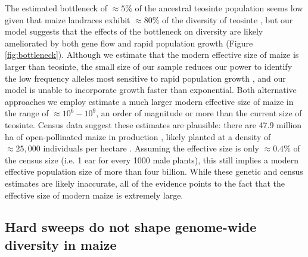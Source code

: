 \documentclass[twoside, twocolumn, letterpaper]{article}
\begin{document}
The estimated bottleneck of $\approx 5\%$ of the ancestral teosinte population seems low given that maize landraces exhibit $\approx 80\%$ of the diversity of teosinte \cite{hufford2012}, but our model suggests that the effects of the bottleneck on diversity are likely ameliorated by both gene flow and rapid population growth (Figure \ref{fig:bottleneck}).   
Although we estimate that the modern effective size of maize is larger than teosinte, the small size of our sample reduces our power to identify the low frequency alleles most sensitive to rapid population growth \cite{keinan2012}, and our model is unable to incorporate growth faster than exponential.  
Both alternative approaches we employ estimate a much larger modern effective size of maize in the range of $\approx 10^6 - 10^9$, an order of magnitude or more than the current size of teosinte.
Census data suggest these estimates are plausible: there are 47.9 million ha of open-pollinated maize in production \cite{cimmyt1999}, likely planted at a density of $\approx 25,000$ individuals per hectare \cite{baden2001}.
Assuming the effective size is only $\approx 0.4\%$ of the census size (i.e. 1 ear for every 1000 male plants), this still implies a modern effective population size of more than four billion.
While these genetic and census estimates are likely inaccurate, all of the evidence points to the fact that the effective size of modern maize is extremely large.


\subsection*{Hard sweeps do not shape genome-wide diversity in maize} %
\end{document}
